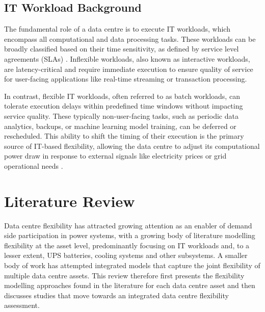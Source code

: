 \documentclass[lettersize,journal]{IEEEtran}
\newcommand{\rev}[1]{#1}
\begin{document}
\subsection{IT Workload Background}
The fundamental role of a data centre is to execute IT workloads, which encompass all computational and data processing tasks. These workloads can be broadly classified based on their time sensitivity, as defined by service level agreements (SLAs) \cite{Liu2024Access,Cao2022ApEn}. Inflexible workloads, also known as interactive workloads, are latency-critical and require immediate execution to ensure quality of service for user-facing applications like real-time streaming or transaction processing.

In contrast, flexible IT workloads, often referred to as batch workloads, can tolerate execution delays within predefined time windows without impacting service quality. These typically non-user-facing tasks, such as periodic data analytics, backups, or machine learning model training, can be deferred or rescheduled. This ability to shift the timing of their execution is the primary source of IT-based flexibility, allowing the data centre to adjust its computational power draw in response to external signals like electricity prices or grid operational needs \cite{Cao2022ApEn}.

\section{Literature Review}\label{sec:literature}

\rev{Data centre flexibility has attracted growing attention as an enabler of demand side participation in power systems, with a growing body of literature modelling flexibility at the asset level, predominantly focusing on IT workloads and, to a lesser extent, UPS batteries, cooling systems and other subsystems. A smaller body of work has attempted integrated models that capture the joint flexibility of multiple data centre assets. This review therefore first presents the flexibility modelling approaches found in the literature for each data centre asset and then discusses studies that move towards an integrated data centre flexibility assessment.}
\end{document}
